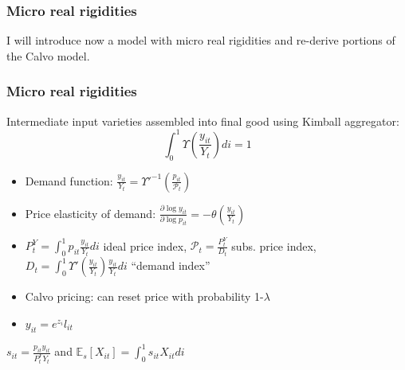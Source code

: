 \documentclass[11pt,aspectratio=169,xcolor={dvipsnames},hyperref={pdftex,pdfpagemode=UseNone,hidelinks,pdfdisplaydoctitle=true},usepdftitle=false]{beamer}
\begin{document}
\begin{frame}
\frametitle{Micro real rigidities}
I will introduce now a model with micro real rigidities and re-derive portions of the Calvo model.
\end{frame}

\begin{frame}
\small 
\frametitle{Micro real rigidities}
\medskip
{} Intermediate input varieties assembled into final good using Kimball aggregator:
\begin{equation*}
	\int_0^1\Upsilon \left(\frac{y_{it}}{Y_{t}}\right) di=1
\end{equation*}
\vspace{-0.2in}
\begin{itemize}[noitemsep]
\item Demand function: $\frac{y_{it}}{Y_{t}} = \Upsilon{{'}^{-1}} \left( \frac{p_{it}}{\mathcal{P}_t}	\right)$
\vspace{0.06in}
\item Price elasticity of demand: \textcolor<3>{RubineRed}{
	$\frac{\partial \log y_{it}}{\partial \log p_{it}} = -\theta \left(\frac{y_{it}}{Y_{t}}\right)$ }
\vspace{0.02in}
\item  $P^Y_t = \int_0^1p_{it}\frac{y_{it}}{Y_{t}}di$ ideal price index, $\mathcal{P}_t = \frac{P^Y_t}{D_t}$ subs. price index, $D_t = \int_0^1  \Upsilon'(\frac{y_{it}}{Y_{t}})\frac{y_{it}}{Y_{t}}di$ ``demand index''
\end{itemize}

\medskip
{} 
\begin{itemize}[noitemsep]
\item Calvo pricing: can reset price with probability 1-$\lambda$
\vspace{0.01in}
\item $y_{it} = e^{z_{i}} l_{it}$
\vspace{0.05in}
\end{itemize} 
{\small {} $s_{it} = \frac{p_{it}y_{it}}{P^Y_t Y_t}$ and $\mathbb{E}_s[X_{it}] = \int_0^1 s_{it} X_{it} di$ }
\end{frame}
\end{document}
